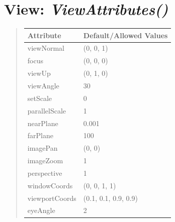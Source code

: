 \documentclass[letterpaper,10pt,english]{sphinxmanual}
\begin{document}
\begin{quote}
\end{quote}

\begin{DUlineblock}{0em}
\item[] 
\end{DUlineblock}

\begin{DUlineblock}{0em}
\item[] 
\end{DUlineblock}


\section{\textbf{View}: \emph{ViewAttributes()}}
\label{attributes:view-viewattributes}
\begin{DUlineblock}{0em}
\item[] 
\end{DUlineblock}
\begin{quote}

\begin{tabulary}{\linewidth}{|L|L|}
\hline

\textbf{Attribute}
 & 
\textbf{Default/Allowed Values}
\\
\hline
viewNormal
 & 
(0, 0, 1)
\\
\hline
focus
 & 
(0, 0, 0)
\\
\hline
viewUp
 & 
(0, 1, 0)
\\
\hline
viewAngle
 & 
30
\\
\hline
setScale
 & 
0
\\
\hline
parallelScale
 & 
1
\\
\hline
nearPlane
 & 
0.001
\\
\hline
farPlane
 & 
100
\\
\hline
imagePan
 & 
(0, 0)
\\
\hline
imageZoom
 & 
1
\\
\hline
perspective
 & 
1
\\
\hline
windowCoords
 & 
(0, 0, 1, 1)
\\
\hline
viewportCoords
 & 
(0.1, 0.1, 0.9, 0.9)
\\
\hline
eyeAngle
 & 
2
\\
\hline\end{tabulary}

\end{quote}

\begin{DUlineblock}{0em}
\item[] 
\end{DUlineblock}
\end{document}
